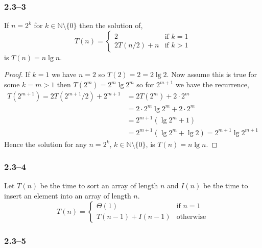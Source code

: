 \subsubsection*{2.3--3}

\begin{proposition}
	\label{prop:power-2-recurrence}
	If $n=2^{k}$ for $k\in\mathbb{N}\setminus\{0\}$ then the solution of,
	\begin{equation*}
		T(n) =
		\begin{cases}
			2 &\text{if }k=1\\
			2T(n/2) + n &\text{if }k>1
		\end{cases}
	\end{equation*}
	is $T(n)=n\lg n$.
\end{proposition}

\begin{proof}
	If $k=1$ we have $n=2$ so $T(2) = 2 = 2\lg 2$. Now assume this is true for some $k=m>1$ then $T(2^{m}) = 2^{m}\lg 2^{m}$ so for $2^{m+1}$ we have the recurrence,
	\begin{equation*}
		\begin{aligned}
			T(2^{m+1}) = 2T(2^{m+1}/2) + 2^{m+1} &= 2T(2^{m}) + 2\cdot2^{m}\\
			&= 2\cdot2^{m}\lg 2^{m} + 2\cdot 2^{m}\\
			&= 2^{m+1}\left(\lg 2^{m} + 1\right)\\
			&= 2^{m+1}\left(\lg 2^{m} + \lg 2\right) = 2^{m+1}\lg 2^{m+1}
		\end{aligned}
	\end{equation*}
	Hence the solution for any $n=2^{k}$, $k\in\mathbb{N}\setminus\{0\}$, is $T(n)=n\lg n$.
\end{proof}

\subsubsection*{2.3--4}

Let $T(n)$ be the time to sort an array of length $n$ and $I(n)$ be the time to insert an element into an array of length $n$.
\begin{equation*}
	T(n) =
	\begin{cases}
		\Theta(1)& \text{if }n=1\\
		T(n-1) + I(n-1)& \text{otherwise}
	\end{cases}
\end{equation*}

\subsubsection*{2.3--5}

